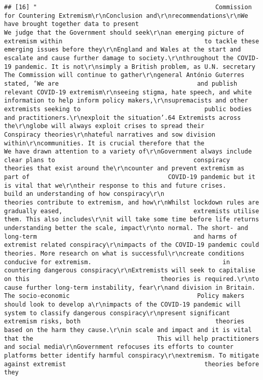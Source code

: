 \documentclass[
]{book}
\begin{document}
\begin{verbatim}
## [16] "                                                 Commission for Countering Extremism\r\nConclusion and\r\nrecommendations\r\nWe have brought together data to present                                      We judge that the Government should seek\r\nan emerging picture of extremism within                                       to tackle these emerging issues before they\r\nEngland and Wales at the start and                                            escalate and cause further damage to society.\r\nthroughout the COVID-19 pandemic. It is not\r\nsimply a British problem, as U.N. secretary                                   The Commission will continue to gather\r\ngeneral António Guterres stated, ‘We are                                      and publish relevant COVID-19 extremism\r\nseeing stigma, hate speech, and white                                         information to help inform policy makers,\r\nsupremacists and other extremists seeking to                                  public bodies and practitioners.\r\nexploit the situation’.64 Extremists across the\r\nglobe will always exploit crises to spread their                              Conspiracy theories\r\nhateful narratives and sow division within\r\ncommunities. It is crucial therefore that the                                 We have drawn attention to a variety of\r\nGovernment always include clear plans to                                      conspiracy theories that exist around the\r\ncounter and prevent extremism as part of                                      COVID-19 pandemic but it is vital that we\r\ntheir response to this and future crises.                                     build an understanding of how conspiracy\r\n                                                                              theories contribute to extremism, and how\r\nWhilst lockdown rules are gradually eased,                                    extremists utilise them. This also includes\r\nit will take some time before life returns                                    understanding better the scale, impact\r\nto normal. The short- and long-term                                           and harms of extremist related conspiracy\r\nimpacts of the COVID-19 pandemic could                                        theories. More research on what is successful\r\ncreate conditions conducive for extremism.                                    in countering dangerous conspiracy\r\nExtremists will seek to capitalise on this                                    theories is required.\r\nto cause further long-term instability, fear\r\nand division in Britain. The socio-economic                                   Policy makers should look to develop a\r\nimpacts of the COVID-19 pandemic will                                         system to classify dangerous conspiracy\r\npresent significant extremism risks, both                                     theories based on the harm they cause.\r\nin scale and impact and it is vital that the                                  This will help practitioners and social media\r\nGovernment refocuses its efforts to counter                                   platforms better identify harmful conspiracy\r\nextremism. To mitigate against extremist                                      theories before they 
\end{verbatim}
\end{document}
